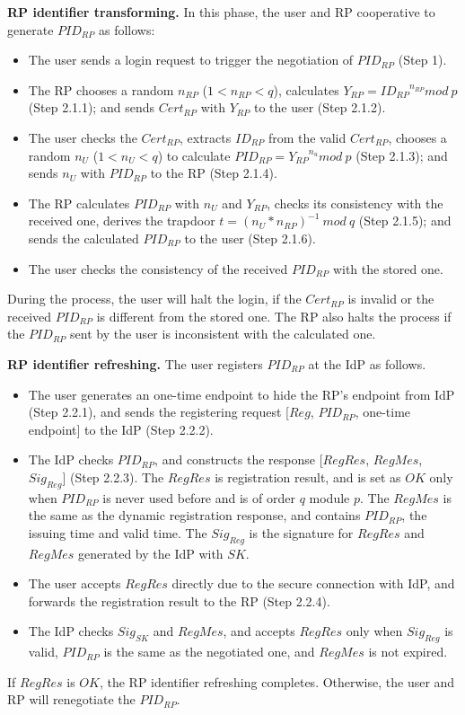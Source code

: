 \vspace{1mm}\noindent\textbf{RP identifier transforming.}
In this phase, the user and RP cooperative to generate $PID_{RP}$ as follows:
\begin{itemize}
  \item The user sends a login request to trigger the negotiation of $PID_{RP}$ (Step 1).
  \item The RP chooses a random $n_{RP}$ ($1 < n_{RP} <q$), calculates $Y_{RP}={ID_{RP}}^{n_{RP}} mod \ p$ (Step 2.1.1); and sends $Cert_{RP}$ with $Y_{RP}$ to the user (Step 2.1.2).
  \item The user checks the $Cert_{RP}$, extracts $ID_{RP}$ from the valid $Cert_{RP}$, chooses a random $n_U$ ($1 < n_U <q$) to calculate $PID_{RP}={Y_{RP}}^{n_{u}} mod \ p$ (Step 2.1.3); and sends $n_U$ with $PID_{RP}$ to the RP (Step 2.1.4).
  \item The RP calculates $PID_{RP}$ with $n_U$ and $Y_{RP}$, checks its consistency with the received one, derives the trapdoor $t={(n_U*n_{RP})}^{-1} \ mod \ q$ (Step 2.1.5); and sends the calculated $PID_{RP}$ to the user (Step 2.1.6).
  \item The user checks the consistency of the received $PID_{RP}$ with the stored one.
\end{itemize}
During the process, the user will halt the login, if  the $Cert_{RP}$ is invalid or the received $PID_{RP}$ is different from the stored one. The RP also halts the process if the $PID_{RP}$ sent by the user is inconsistent with the calculated one.

\vspace{1mm}\noindent\textbf{RP identifier refreshing.}
The user registers $PID_{RP}$ at the IdP as follows.
\begin{itemize}
  \item The user generates an one-time endpoint to hide the RP's endpoint from IdP (Step 2.2.1), and sends the registering request [$Reg$, $PID_{RP}$, one-time endpoint] to the IdP (Step 2.2.2).
  \item The IdP checks $PID_{RP}$, and constructs the response [$RegRes$, $RegMes$, $Sig_{Reg}$] (Step 2.2.3). The $RegRes$ is registration result, and is set as $OK$ only when $PID_{RP}$ is never used before and is of order $q$ module $p$. The $RegMes$ is the same as the dynamic registration response, and contains $PID_{RP}$, the issuing time and valid time. The $Sig_{Reg}$ is the signature for $RegRes$ and $RegMes$ generated by the IdP with $SK$.
  \item The user accepts $RegRes$ directly due to the secure connection with IdP, and forwards the registration result to the RP (Step 2.2.4).
  \item The IdP checks $Sig_{SK}$ and $RegMes$, and accepts $RegRes$ only when $Sig_{Reg}$ is valid, $PID_{RP}$ is the same as the negotiated one, and $RegMes$ is not expired.
\end{itemize}
If $RegRes$ is $OK$, the RP identifier refreshing completes. Otherwise, the user and RP will renegotiate the $PID_{RP}$.

